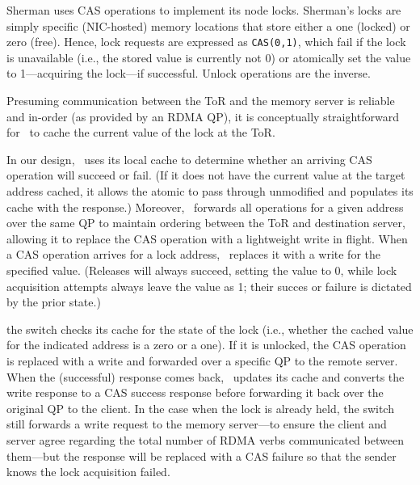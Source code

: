 Sherman uses CAS operations to implement its node locks.
%
Sherman's locks are simply specific (NIC-hosted) memory locations
that store either a one (locked) or zero (free).  Hence, lock requests
are expressed as \texttt{CAS(0,1)}, which fail if the lock is
unavailable (i.e., the stored value is currently not 0) or atomically
set the value to 1---acquiring the lock---if successful. Unlock
operations are the inverse.



Presuming communication between the ToR and the memory server is
reliable and in-order (as provided by an RDMA QP), it is conceptually
straightforward for \sword\ to cache the current value of the lock at
the ToR.


In our design, \sword\ uses its local cache to determine whether an
arriving CAS operation will succeed or fail.  (If it does not have the
current value at the target address cached, it allows the atomic to
pass through unmodified and populates its cache with the response.)
Moreover, \sword\ forwards all operations for a given address over the
same QP to maintain ordering between the ToR and destination server,
allowing it to replace the CAS operation with a lightweight write in
flight.  When a CAS operation arrives for a lock address,
\sword\ replaces it with a write for the specified value.  (Releases
will always succeed, setting the value to 0, while lock acquisition attempts always leave the value as 1; their succes or failure is dictated by the prior state.)

the switch checks its
cache for the state of the lock (i.e., whether the cached value for the indicated address is a zero or a one). If it is unlocked, the CAS operation
is replaced with a write and forwarded over a specific QP to the
remote server. When the (successful) response comes back,
\sword\ updates its cache and converts the write response to a CAS
success response before forwarding it back over the original QP to the
client. In the case when the lock is already held, the switch still
forwards a write request to the memory server---to ensure the client
and server agree regarding the total number of RDMA verbs communicated
between them---but the response will be replaced with a CAS failure so
that the sender knows the lock acquisition failed.



